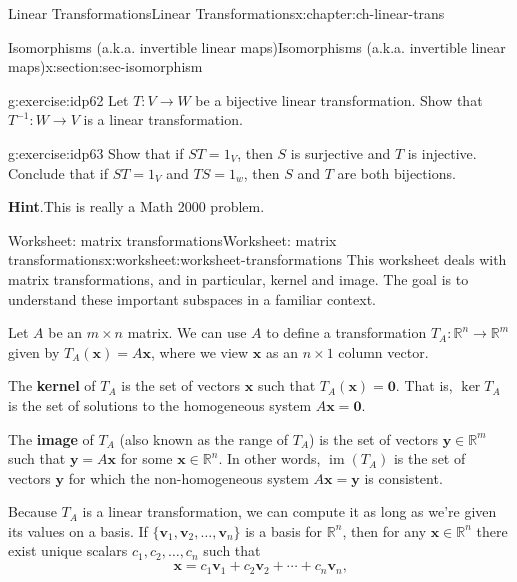 \documentclass[oneside,10pt,]{book}
\newcommand{\blocktitlefont}{\relax}
\newcommand{\terminology}[1]{\textbf{#1}}
\numberwithin{equation}{section}
\newcommand{\R}{\mathbb{R}}
\newcommand{\im}{\operatorname{im}}
\newcommand{\vv}{\mathbf{v}}
\newcommand{\xx}{\mathbf{x}}
\newcommand{\yy}{\mathbf{y}}
\newcommand{\zer}{\mathbf{0}}
\begin{document}
\begin{chapterptx}{Linear Transformations}{}{Linear Transformations}{}{}{x:chapter:ch-linear-trans}
\begin{sectionptx}{Isomorphisms (a.k.a. invertible linear maps)}{}{Isomorphisms (a.k.a. invertible linear maps)}{}{}{x:section:sec-isomorphism}
\begin{inlineexercise}{}{g:exercise:idp62}%
Let \(T:V\to W\) be a bijective linear transformation. Show that \(T^{-1}:W\to V\) is a linear transformation.%
\end{inlineexercise}%
\begin{inlineexercise}{}{g:exercise:idp63}%
Show that if \(ST=1_V\), then \(S\) is surjective and \(T\) is injective. Conclude that if \(ST=1_V\) and \(TS=1_w\), then \(S\) and \(T\) are both bijections.%
\par\smallskip%
\noindent\textbf{\blocktitlefont Hint}.\hypertarget{g:hint:idp64}{}\quad{}This is really a Math 2000 problem.%
\end{inlineexercise}%
\end{sectionptx}
%
%
\typeout{************************************************}
\typeout{************************************************}
%
\begin{worksheet-section}{Worksheet: matrix transformations}{}{Worksheet: matrix transformations}{}{}{x:worksheet:worksheet-transformations}
This worksheet deals with matrix transformations, and in particular, kernel and image. The goal is to understand these important subspaces in a familiar context.%
\par
Let \(A\) be an \(m\times n\) matrix. We can use \(A\) to define a transformation \(T_A:\R^n\to \R^m\) given by \(T_A(\xx)=A\xx\), where we view \(\xx\) as an \(n\times 1\) column vector.%
\par
The \terminology{kernel} of \(T_A\) is the set of vectors \(\xx\) such that \(T_A(\xx)=\zer\). That is, \(\ker T_A\) is the set of solutions to the homogeneous system \(A\xx = \zer\).%
\par
The \terminology{image} of \(T_A\) (also known as the range of \(T_A\)) is the set of vectors \(\yy\in \R^m\) such that \(\yy = A\xx\) for some \(\xx\in\R^n\). In other words, \(\im(T_A)\) is the set of vectors \(\yy\) for which the non-homogeneous system \(A\xx=\yy\) is consistent.%
\par
Because \(T_A\) is a linear transformation, we can compute it as long as we're given its values on a basis. If \(\{\vv_1, \vv_2,\ldots, \vv_n\}\) is a basis for \(\R^n\), then for any \(\xx\in\R^n\) there exist unique scalars \(c_1,c_2,\ldots, c_n\) such that%
\begin{equation*}
\xx = c_1\vv_1+c_2\vv_2+\cdots + c_n\vv_n\text{,}
\end{equation*}

\end{worksheet-section}
\end{chapterptx}
\end{document}
